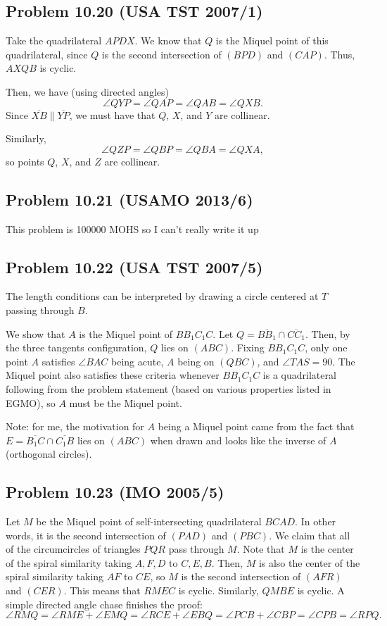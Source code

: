 \documentclass{scrartcl}
\begin{document}
\subsection*{Problem 10.20 (USA TST 2007/1)}
Take the quadrilateral $APDX$. We know that $Q$ is the Miquel point of this quadrilateral, since $Q$ is the
second intersection of $(BPD)$ and $(CAP)$. Thus, $AXQB$ is cyclic.

Then, we have (using directed angles)
\[ \angle QYP = \angle QAP = \angle QAB = \angle QXB. \]
Since $\overline{XB} \parallel \overline{YP}$, we must have that $Q$, $X$, and $Y$ are collinear.

Similarly,
\[ \angle QZP = \angle QBP = \angle QBA = \angle QXA, \]
so points $Q$, $X$, and $Z$ are collinear.

\subsection*{Problem 10.21 (USAMO 2013/6)}
This problem is 100000 MOHS so I can't really write it up

\subsection*{Problem 10.22 (USA TST 2007/5)}
The length conditions can be interpreted by drawing a circle centered at $T$ passing through $B$.

We show that $A$ is the Miquel point of $BB_1C_1C$. Let $Q = \overline{BB_1} \cap \overline{CC_1}$. Then, by the
three tangents configuration, $Q$ lies on $(ABC)$. Fixing $BB_1C_1C$, only one point $A$ satisfies $\angle BAC$ being acute,
$A$ being on $(QBC)$, and $\angle TAS = 90$. The Miquel point also satisfies these criteria whenever $BB_1C_1C$
is a quadrilateral following from the problem statement (based on various properties listed in EGMO), so $A$
must be the Miquel point.

Note: for me, the motivation for $A$ being a Miquel point came from the fact that $E = \overline{B_1C} \cap \overline{C_1B}$
lies on $(ABC)$ when drawn and looks like the inverse of $A$ (orthogonal circles).

\subsection*{Problem 10.23 (IMO 2005/5)}
Let $M$ be the Miquel point of self-intersecting quadrilateral $BCAD$. In other words, it is the second intersection
of $(PAD)$ and $(PBC)$. We claim that all of the circumcircles of triangles $PQR$ pass through $M$.
Note that $M$ is the center of the spiral similarity taking $A,F,D$ to $C,E,B$.
Then, $M$ is also the center of the spiral similarity taking $AF$ to $CE$, so $M$ is the second intersection of
$(AFR)$ and $(CER)$. This means that $RMEC$ is cyclic. Similarly, $QMBE$ is cyclic. A simple directed angle chase finishes
the proof:
\[ \angle RMQ = \angle RME + \angle EMQ = \angle RCE + \angle EBQ = \angle PCB + \angle CBP = \angle CPB = \angle RPQ. \]
\end{document}
